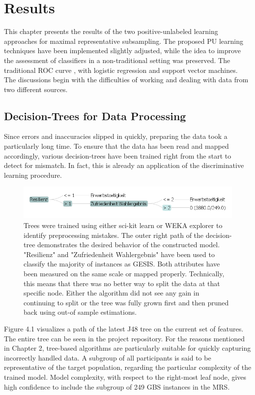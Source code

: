 \chapter{Results}\label{Sec:Results}

This chapter presents the results of the two positive-unlabeled learning approaches for maximal representative subsampling. The proposed PU learning techniques have been implemented slightly adjusted, while the idea to improve the assessment of classifiers in a non-traditional setting was preserved. The traditional ROC curve , with logistic regression and support vector machines. The discussions begin with the difficulties of working and dealing with data from two different sources.

\section{Decision-Trees for Data Processing}

Since errors and inaccuracies slipped in quickly, preparing the data took a particularly long time. To ensure that the data has been read and mapped accordingly, various decision-trees have been trained right from the start to detect for mismatch. In fact, this is already an application of the discriminative learning procedure.

\begin{figure}[ht]
\centering
\vspace{0.25cm}
   \includegraphics[scale=0.65,angle=0]{fig/treepath}
\captionsetup{width= 380pt}
\caption{Trees were trained using either sci-kit learn or WEKA explorer to identify preprocessing mistakes. The outer right path of the decision-tree demonstrates the desired behavior of the constructed model. "Resilienz"  and "Zufriedenheit Wahlergebnis" have been used to classify the majority of instances as GESIS. Both attributes have been measured on the same scale or mapped properly. Technically, this means that there was no better way to split the data at that specific node. Either the algorithm did not see any gain in continuing to split or the tree was fully grown first and then pruned back using out-of sample estimations.}
\end{figure}

Figure 4.1 visualizes a path of the latest J48 tree on the current set of features. The entire tree can be seen in the project repository. For the reasons mentioned in Chapter 2, tree-based algorithms are particularly suitable for quickly capturing incorrectly handled data. A subgroup of all participants is said to be representative of the target population, regarding the particular complexity of the trained model. Model complexity, with respect to the right-most leaf node, gives high confidence to include the subgroup of 249 GBS instances in the MRS. 

